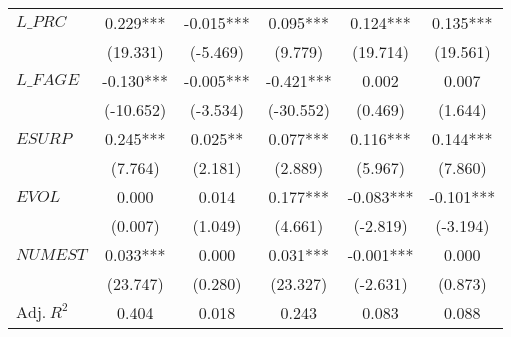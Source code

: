 \begin{spacing}{1.0}
\begin{table}
\begin{tabularx}{\linewidth}{X * {5}{S[table-format=4.3]}}
\addlinespace
$L\_PRC$ & 0.229*** & -0.015*** & 0.095*** & 0.124*** & 0.135***\\
 & (19.331) & (-5.469) & (9.779) & (19.714) & (19.561)\\
\addlinespace
$L\_FAGE$ & -0.130*** & -0.005*** & -0.421*** & 0.002 & 0.007\\
 & (-10.652) & (-3.534) & (-30.552) & (0.469) & (1.644)\\
\addlinespace
$ESURP$ & 0.245*** & 0.025** & 0.077*** & 0.116*** & 0.144***\\
 & (7.764) & (2.181) & (2.889) & (5.967) & (7.860)\\
\addlinespace
$EVOL$ & 0.000 & 0.014 & 0.177*** & -0.083*** & -0.101***\\
 & (0.007) & (1.049) & (4.661) & (-2.819) & (-3.194)\\
\addlinespace
$NUMEST$ & 0.033*** & 0.000 & 0.031*** & -0.001*** & 0.000\\
 & (23.747) & (0.280) & (23.327) & (-2.631) & (0.873)\\
\midrule
$\textrm{Adj.} \: R^2$ & 0.404 & 0.018 & 0.243 & 0.083 & 0.088\\
\bottomrule
\end{tabularx}

\end{table}
\end{spacing}